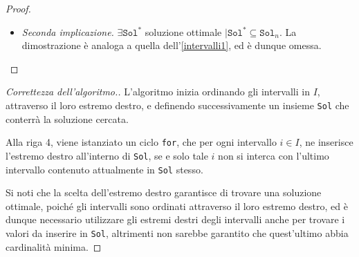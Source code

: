 \documentclass[a4paper, 12pt]{report}
\begin{document}
\begin{proof}
\begin{itemize}
\begin{itemize}
                    \item sia $j \in [1, n) \mid x \in [a_j, b_j]$; allora, si verifica uno dei seguenti casi:
                        \begin{itemize}
                            \item $j \le k \implies \exists \hat x \in \texttt{Sol}_k \mid \hat x \in [a_j, b_j]$ poiché doveva essere già stato analizzato dall'algoritmo
                            \item $j > k + 1 \implies b_j > b_{k +1}$; si noti inoltre che l'intervallo $[a_j, b_j]$ è stato scelto tale che $x \in [a_j, b_j]$, e poiché $x \in [a_{k +1}, b_{k +1}]$ per sua definizione, si verifica necessariamente che $$\left .\begin{array}{r} x \in [a_j , b_j] \cap [a_{k + 1}, b_{k +1}] \neq \varnothing \\ b_j > b_{k +1} \end{array} \right \} \implies a_j \le x \le b_{k +1} \le b_j$$ in particolare, si noti che $b_{k +1} \in [a_j, b_j]$, e poiché la dimostrazione non dipende dalla scelta di $x \in \texttt{Sol}^* - \texttt{Sol}_k$, né da $j \in [1, n)$, si ha che $b_{k +1}$ copre ogni intervallo coperto da $x$; allora, per far si che esista soluzione ottimale $\texttt{Sol}^*$ tale da contenere $\texttt{Sol}_{k +1} = \texttt{Sol}_k \cup \{b_{k +1}\}$, è sufficiente considerare $$(\texttt{Sol}^* - \{x\}) \cup \{b_{k +1}\}$$
                        \end{itemize}
                \end{itemize}
            \item[] \textit{Seconda implicazione.} $\exists \texttt{Sol}^*$ soluzione ottimale $\mid \texttt{Sol}^* \subseteq \texttt{Sol}_n$. La dimostrazione è analoga a quella dell'\cref{intervalli1}, ed è dunque omessa.
        \end{itemize}
    \end{proof}

    \begin{proof}[Correttezza dell'algoritmo.]
        L'algoritmo inizia ordinando gli intervalli in $I$, attraverso il loro estremo destro, e definendo successivamente un insieme \texttt{Sol} che conterrà la soluzione cercata.

        Alla riga 4, viene istanziato un ciclo \texttt{for}, che per ogni intervallo $i \in I$, ne inserisce l'estremo destro all'interno di \texttt{Sol}, se e solo tale $i$ non si interca con l'ultimo intervallo contenuto attualmente in \texttt{Sol} stesso.

        Si noti che la scelta dell'estremo destro garantisce di trovare una soluzione ottimale, poiché gli intervalli sono ordinati attraverso il loro estremo destro, ed è dunque necessario utilizzare gli estremi destri degli intervalli anche per trovare i valori da inserire in \texttt{Sol}, altrimenti non sarebbe garantito che quest'ultimo abbia cardinalità minima.
    \end{proof}
\end{document}

